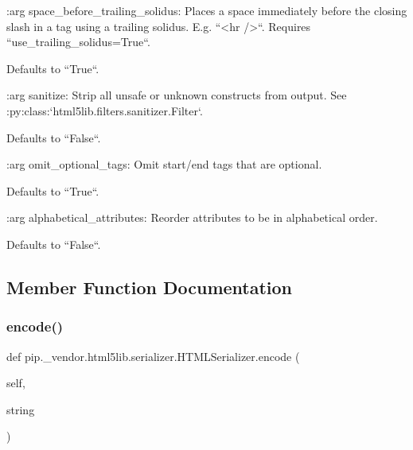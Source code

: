 \begin{DoxyVerb}
:arg space_before_trailing_solidus: Places a space immediately before
    the closing slash in a tag using a trailing solidus. E.g.
    ``<hr />``. Requires ``use_trailing_solidus=True``.

    Defaults to ``True``.

:arg sanitize: Strip all unsafe or unknown constructs from output.
    See :py:class:`html5lib.filters.sanitizer.Filter`.

    Defaults to ``False``.

:arg omit_optional_tags: Omit start/end tags that are optional.

    Defaults to ``True``.

:arg alphabetical_attributes: Reorder attributes to be in alphabetical order.

    Defaults to ``False``.\end{DoxyVerb}
 

\subsection{Member Function Documentation}
\mbox{\label{classpip_1_1__vendor_1_1html5lib_1_1serializer_1_1HTMLSerializer_abd4ec299ae81add037a31df220eb9e6f}} 
\subsubsection{\texorpdfstring{encode()}{encode()}}
{\footnotesize\ttfamily def pip.\+\_\+vendor.\+html5lib.\+serializer.\+H\+T\+M\+L\+Serializer.\+encode (\begin{DoxyParamCaption}\item[{}]{self,  }\item[{}]{string }\end{DoxyParamCaption})}

\mbox{\label{classpip_1_1__vendor_1_1html5lib_1_1serializer_1_1HTMLSerializer_a05ecfa5b96a086e6d65e756184e1b817}} 
